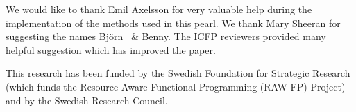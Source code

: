 \documentclass{sigplanconf}
\newcommand{\docname}{Bj\"{o}rn}
\newcommand{\studname}{Benny}
\begin{document}

%


%
%



\acks
We would like to thank Emil Axelsson for very valuable help 
during the implementation of the methods used in this pearl. We 
thank Mary Sheeran for suggesting the names \docname~ \& \studname. 
The ICFP reviewers provided many helpful suggestion which has improved the 
paper.

This research has been funded by the Swedish Foundation for
Strategic Research (which funds the Resource Aware Functional 
Programming (RAW FP) Project) and by the Swedish Research Council.
\end{document}
